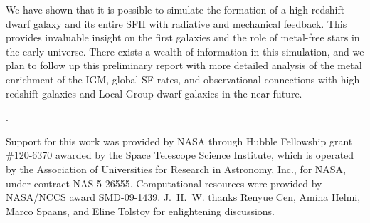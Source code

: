 \documentclass[12pt]{article}
\newcounter{lastnote}
\newenvironment{scilastnote}{%
\setcounter{lastnote}{\value{enumiv}}%
\addtocounter{lastnote}{+1}%
\begin{list}%
{\arabic{lastnote}.}
{\setlength{\leftmargin}{.22in}}
{\setlength{\labelsep}{.5em}}}
{\end{list}}
\begin{document}
We have shown that it is possible to simulate the formation of a
high-redshift dwarf galaxy and its entire SFH with radiative and
mechanical feedback.  This provides invaluable insight on the first
galaxies and the role of metal-free stars in the early universe.
There exists a wealth of information in this simulation, and we plan
to follow up this preliminary report with more detailed analysis of
the metal enrichment of the IGM, global SF rates, and observational
connections with high-redshift galaxies and Local Group dwarf galaxies
in the near future.





\begin{scilastnote}
\item Support for this work was provided by NASA through Hubble Fellowship
grant \#120-6370 awarded by the Space Telescope Science Institute,
which is operated by the Association of Universities for Research in
Astronomy, Inc., for NASA, under contract NAS 5-26555.  Computational
resources were provided by NASA/NCCS award SMD-09-1439.
J.~H.~W. thanks Renyue Cen, Amina Helmi, Marco Spaans, and Eline
Tolstoy for enlightening discussions.
\end{scilastnote}

\end{document}
